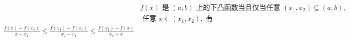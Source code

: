 \documentclass[preview]{standalone}
\begin{document}
\begin{align*}
& f(x) \text{ 是 } (a, b) \text{ 上的下凸函数当且仅当任意 } (x_1, x_2) \subseteq (a, b),\\ & \text{ 任意 } x \in (x_1, x_2), \text{ 有} \\ \frac{f(x) - f(x_1)}{x - x_1} \leqslant \frac{f(x_2) - f(x_1)}{x_2 - x_1} \leqslant \frac{f(x_2) - f(x)}{x_2 - x}
\end{align*}
\end{document}
